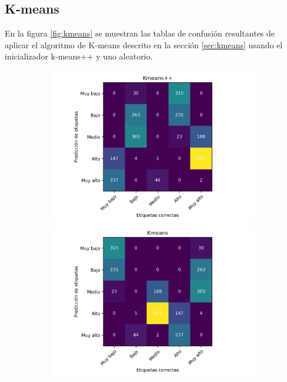 \subsection{K-means}

En la figura \ref{fig:kmeans} se muestran las tablas de confusión resultantes de aplicar el algoritmo de K-means descrito en la sección \ref{sec:kmeans} usando el inicializador k-means++ y uno aleatorio.

\begin{figure}[H]
    \centering
    \begin{subfigure}{8.4cm}
        \includegraphics[width=1\linewidth]{Graphics/Data_2015/Kmeans++_confusion_matrix.png}
        \includegraphics[width=1\linewidth]{Graphics/Data_2015/Kmeans_random_confusion_matrix.png}

\end{subfigure}
\end{figure}

